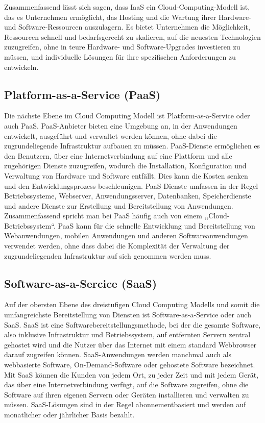Zusammenfassend lässt sich sagen, dass IaaS ein Cloud-Computing-Modell ist, das es Unternehmen ermöglicht, das Hosting und die Wartung ihrer Hardware- und Software-Ressourcen auszulagern. Es bietet Unternehmen die Möglichkeit, Ressourcen schnell und bedarfsgerecht zu skalieren, auf die neuesten Technologien zuzugreifen, ohne in teure Hardware- und Software-Upgrades investieren zu müssen, und individuelle Lösungen für ihre spezifischen Anforderungen zu entwickeln. \cite[vgl.][31]{HuaweiTechnologies.2023} \\


\subsection{Platform-as-a-Service (PaaS)}
Die nächste Ebene im Cloud Computing Modell ist Platform-as-a-Service oder auch PaaS. PaaS-Anbieter bieten eine Umgebung an, in der Anwendungen entwickelt, ausgeführt und verwaltet werden können, ohne dabei die zugrundeliegende Infrastruktur aufbauen zu müssen. PaaS-Dienste ermöglichen es den Benutzern, über eine Internetverbindung auf eine Plattform und alle zugehörigen Dienste zuzugreifen, wodurch die Installation, Konfiguration und Verwaltung von Hardware und Software entfällt. Dies kann die Kosten senken und den Entwicklungsprozess beschleunigen. PaaS-Dienste umfassen in der Regel Betriebssysteme, Webserver, Anwendungsserver, Datenbanken, Speicherdienste und andere Dienste zur Erstellung und Bereitstellung von Anwendungen. \\
Zusammenfassend spricht man bei PaaS häufig auch von einem ,,Cloud-Betriebssystem``. PaaS kann für die schnelle Entwicklung und Bereitstellung von Webanwendungen, mobilen Anwendungen und anderen Softwareanwendungen verwendet werden, ohne dass dabei die Komplexität der Verwaltung der zugrundeliegenden Infrastruktur auf sich genommen werden muss. \cite[vgl.][31ff.]{HuaweiTechnologies.2023} \\


\subsection{Software-as-a-Sercice (SaaS)}
Auf der obersten Ebene des dreistufigen Cloud Computing Modells und somit die umfangreichste Bereitstellung von Diensten ist Software-as-a-Service oder auch SaaS. SaaS ist eine Softwarebereitstellungsmethode, bei der die gesamte Software, also inklusive Infrastruktur und Betriebssystem, auf entfernten Servern zentral gehostet wird und die Nutzer über das Internet mit einem standard Webbrowser darauf zugreifen können. SaaS-Anwendungen werden manchmal auch als webbasierte Software, On-Demand-Software oder gehostete Software bezeichnet. Mit SaaS können die Kunden von jedem Ort, zu jeder Zeit und mit jedem Gerät, das über eine Internetverbindung verfügt, auf die Software zugreifen, ohne die Software auf ihren eigenen Servern oder Geräten installieren und verwalten zu müssen. SaaS-Lösungen sind in der Regel abonnementbasiert und werden auf monatlicher oder jährlicher Basis bezahlt. \\

